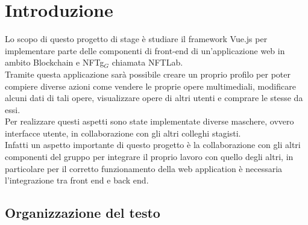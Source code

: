 
\chapter{Introduzione}
\label{cap:introduzione}

Lo scopo di questo progetto di stage è studiare il framework Vue.js per implementare parte delle componenti di front-end di un'applicazione web in ambito Blockchain e \gls{NFTg}$_G$ chiamata NFTLab. \\
Tramite questa applicazione sarà possibile creare un proprio profilo per poter compiere diverse azioni come vendere le proprie opere multimediali, modificare alcuni dati di tali opere, visualizzare opere di altri utenti e comprare le stesse da essi. \\
Per realizzare questi aspetti sono state implementate diverse maschere, ovvero interfacce utente, in collaborazione con gli altri colleghi stagisti.\\
Infatti un aspetto importante di questo progetto è la collaborazione con gli altri componenti del gruppo per integrare il proprio lavoro con quello degli altri, in particolare per il corretto funzionamento della web application è necessaria l'integrazione tra front end e back end.






\section{Organizzazione del testo}

